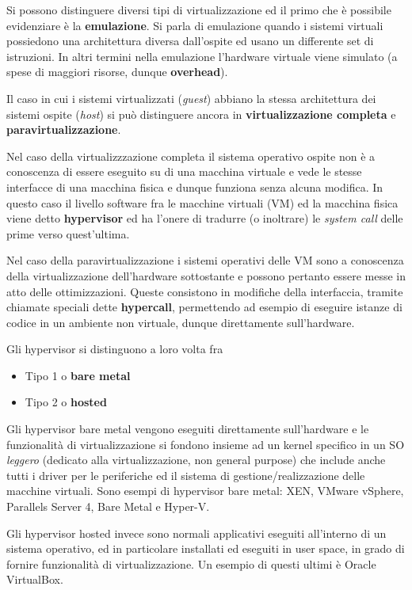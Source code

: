 \documentclass[italian,]{article}
\providecommand{\tightlist}{%
  \setlength{\itemsep}{0pt}\setlength{\parskip}{0pt}}
\begin{document}
Si possono distinguere diversi tipi di virtualizzazione ed il primo che
è possibile evidenziare è la \textbf{emulazione}. Si parla di emulazione
quando i sistemi virtuali possiedono una architettura diversa
dall'ospite ed usano un differente set di istruzioni. In altri termini
nella emulazione l'hardware virtuale viene simulato (a spese di maggiori
risorse, dunque \textbf{overhead}).

Il caso in cui i sistemi virtualizzati (\emph{guest}) abbiano la stessa
architettura dei sistemi ospite (\emph{host}) si può distinguere ancora
in \textbf{virtualizzazione completa} e \textbf{paravirtualizzazione}.

Nel caso della virtualizzzazione completa il sistema operativo ospite
non è a conoscenza di essere eseguito su di una macchina virtuale e vede
le stesse interfacce di una macchina fisica e dunque funziona senza
alcuna modifica. In questo caso il livello software fra le macchine
virtuali (VM) ed la macchina fisica viene detto \textbf{hypervisor} ed
ha l'onere di tradurre (o inoltrare) le \emph{system call} delle prime
verso quest'ultima.

Nel caso della paravirtualizzazione i sistemi operativi delle VM sono a
conoscenza della virtualizzazione dell'hardware sottostante e possono
pertanto essere messe in atto delle ottimizzazioni. Queste consistono in
modifiche della interfaccia, tramite chiamate speciali dette
\textbf{hypercall}, permettendo ad esempio di eseguire istanze di codice
in un ambiente non virtuale, dunque direttamente sull'hardware.

Gli hypervisor si distinguono a loro volta fra

\begin{itemize}
\tightlist
\item
  Tipo 1 o \textbf{bare metal}
\item
  Tipo 2 o \textbf{hosted}
\end{itemize}

Gli hypervisor bare metal vengono eseguiti direttamente sull'hardware e
le funzionalità di virtualizzazione si fondono insieme ad un kernel
specifico in un SO \emph{leggero} (dedicato alla virtualizzazione, non
general purpose) che include anche tutti i driver per le periferiche ed
il sistema di gestione/realizzazione delle macchine virtuali. Sono
esempi di hypervisor bare metal: XEN, VMware vSphere, Parallels Server
4, Bare Metal e Hyper-V.

Gli hypervisor hosted invece sono normali applicativi eseguiti
all'interno di un sistema operativo, ed in particolare installati ed
eseguiti in user space, in grado di fornire funzionalità di
virtualizzazione. Un esempio di questi ultimi è Oracle VirtualBox.
\end{document}
